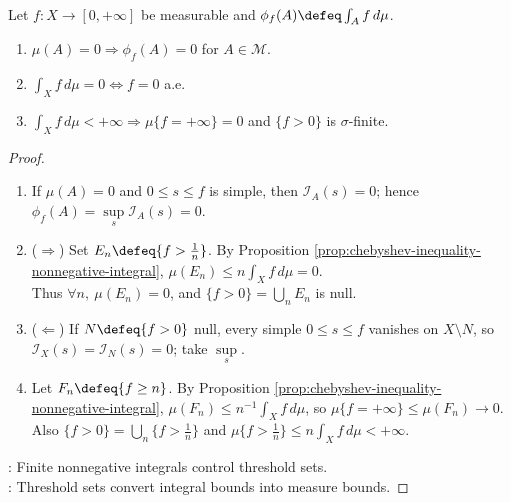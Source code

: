 \begin{corollary} \label{cor:integral-null-and-finite-ae-consequences} \\
Let $f:X\to[0,+\infty]$ be measurable and $\phi_f(A)\defeq\int_A f\,d\mu$.
\begin{enumerate}[label=(\roman*)]
\setlength{\itemsep}{0pt}
\item $\mu(A)=0\Longrightarrow\phi_f(A)=0$ for $A\in\mathcal{M}$.
\item $\int_X f\,d\mu=0\Longleftrightarrow f=0$ a.e.
\item $\int_X f\,d\mu<+\infty\Longrightarrow\mu\{f=+\infty\}=0$ and $\{f>0\}$ is $\sigma$-finite.
\end{enumerate}
\begin{proof}
\begin{enumerate}[label=(\roman*)]
\setlength{\itemsep}{0pt}
\item[$(i)$] If $\mu(A)=0$ and $0\leq s\leq f$ is simple, then $\mathcal{I}_A(s)=0$; hence $\phi_f(A)=\sup\limits_s\mathcal{I}_A(s)=0$.
\item[$(ii)$] ($\Rightarrow$) Set $E_n\defeq\{f>\frac{1}{n}\}$. By Proposition \ref{prop:chebyshev-inequality-nonnegative-integral}, $\mu(E_n)\leq n\int_X f\,d\mu=0$.\\
Thus $\forall n,\ \mu(E_n)=0$, and $\{f>0\}=\bigcup\limits_nE_n$ is null.
\item[$(ii)$] ($\Leftarrow$) If $N\defeq\{f>0\}$ null, every simple $0\leq s\leq f$ vanishes on $X\setminus N$, so $\mathcal{I}_X(s)=\mathcal{I}_N(s)=0$; take $\sup\limits_s$.
\item[$(iii)$] Let $F_n\defeq\{f\geq n\}$. By Proposition \ref{prop:chebyshev-inequality-nonnegative-integral}, $\mu(F_n)\leq n^{-1}\int_X f\,d\mu$, so $\mu\{f=+\infty\}\leq\mu(F_n)\to0$.\\
Also $\{f>0\}=\bigcup\limits_n\{f>\frac{1}{n}\}$ and $\mu\{f>\frac{1}{n}\}\leq n\int_X f\,d\mu<+\infty$.
\end{enumerate}
: Finite nonnegative integrals control threshold sets.\\
: Threshold sets convert integral bounds into measure bounds.
\end{proof}
\end{corollary}

